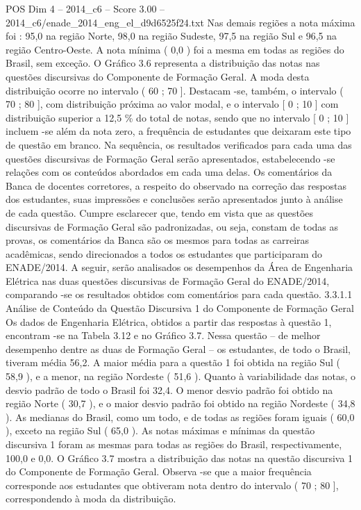 \begin{textsample}{POS Dim 4 – 2014\_c6 – Score 3.00 – 2014\_c6/enade\_2014\_eng\_el\_d9d6525f24.txt}
Nas demais regiões a nota máxima foi : 95,0 na região Norte, 98,0 na região Sudeste, 97,5 na região Sul e 96,5 na região Centro-Oeste.
A nota mínima ( 0,0 ) foi a mesma em todas as regiões do Brasil, sem exceção.
O Gráfico 3.6 representa a distribuição das notas nas questões discursivas do Componente de Formação Geral.
A moda desta distribuição ocorre no intervalo ( 60 ; 70 ].
Destacam -se, também, o intervalo ( 70 ; 80 ], com distribuição próxima ao valor modal, e o intervalo [ 0 ; 10 ] com distribuição superior a 12,5 \% do total de notas, sendo que no intervalo [ 0 ; 10 ] incluem -se além da nota zero, a frequência de estudantes que deixaram este tipo de questão em branco.
Na sequência, os resultados verificados para cada uma das questões discursivas de Formação Geral serão apresentados, estabelecendo -se relações com os conteúdos abordados em cada uma delas.
Os comentários da Banca de docentes corretores, a respeito do observado na correção das respostas dos estudantes, suas impressões e conclusões serão apresentados junto à análise de cada questão.
Cumpre esclarecer que, tendo em vista que as questões discursivas de Formação Geral são padronizadas, ou seja, constam de todas as provas, os comentários da Banca são os mesmos para todas as carreiras acadêmicas, sendo direcionados a todos os estudantes que participaram do ENADE/2014.
A seguir, serão analisados os desempenhos da Área de Engenharia Elétrica nas duas questões discursivas de Formação Geral do ENADE/2014, comparando -se os resultados obtidos com comentários para cada questão. 3.3.1.1 Análise de Conteúdo da Questão Discursiva 1 do Componente de Formação Geral Os dados de Engenharia Elétrica, obtidos a partir das respostas à questão 1, encontram -se na Tabela 3.12 e no Gráfico 3.7.
Nessa questão – de melhor desempenho dentre as duas de Formação Geral – os estudantes, de todo o Brasil, tiveram média 56,2.
A maior média para a questão 1 foi obtida na região Sul ( 58,9 ), e a menor, na região Nordeste ( 51,6 ).
Quanto à variabilidade das notas, o desvio padrão de todo o Brasil foi 32,4.
O menor desvio padrão foi obtido na região Norte ( 30,7 ), e o maior desvio padrão foi obtido na região Nordeste ( 34,8 ).
As medianas do Brasil, como um todo, e de todas as regiões foram iguais ( 60,0 ), exceto na região Sul ( 65,0 ).
As notas máximas e mínimas da questão discursiva 1 foram as mesmas para todas as regiões do Brasil, respectivamente, 100,0 e 0,0.
O Gráfico 3.7 mostra a distribuição das notas na questão discursiva 1 do Componente de Formação Geral.
Observa -se que a maior frequência corresponde aos estudantes que obtiveram nota dentro do intervalo ( 70 ; 80 ], correspondendo à moda da distribuição.

\end{textsample}
